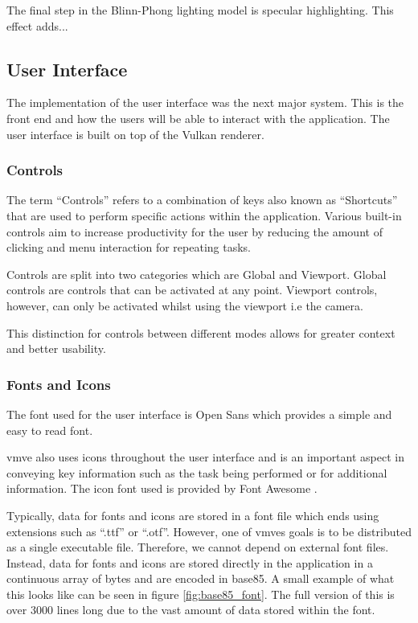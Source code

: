 \documentclass[11pt]{article}
\begin{document}
The final step in the Blinn-Phong lighting model is specular highlighting. This
effect adds...


\subsection{User Interface}
The implementation of the user interface was the next major system. This is
the front end and how the users will be able to interact with the application.
The user interface is built on top of the Vulkan renderer.



\subsubsection{Controls}
The term ``Controls'' refers to a combination of keys also known as
``Shortcuts'' that are used to perform specific actions within the application.
Various built-in controls aim to increase productivity for the user by reducing
the amount of clicking and menu interaction for repeating tasks.

Controls are split into two categories which are Global and Viewport. Global
controls are controls that can be activated at any point. Viewport controls,
however, can only be activated whilst using the viewport i.e the camera.

This distinction for controls between different modes allows for greater context
and better usability. 

\subsubsection{Fonts and Icons}
The font used for the user interface is Open Sans which provides a simple and
easy to read font.

\gls*{vmve} also uses icons throughout the user interface and is an important
aspect in conveying key information such as the task being performed or for
additional information. The icon font used is provided by Font Awesome
\cite{font-awesome}.

Typically, data for fonts and icons are stored in a font file which ends using
extensions such as ``.ttf'' or ``.otf''. However, one of \glspl*{vmve} goals is
to be distributed as a single executable file. Therefore, we cannot depend on
external font files. Instead, data for fonts and icons are stored directly in
the application in a continuous array of bytes and are encoded in base85. A
small example of what this looks like can be seen in figure
\ref{fig:base85_font}. The full version of this is over 3000 lines long due to
the vast amount of data stored within the font.
\end{document}
